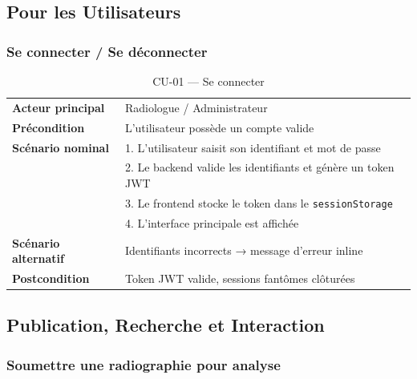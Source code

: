 \documentclass[12pt, a4paper]{report}
\begin{document}
\subsection{Pour les Utilisateurs}

\subsubsection{Se connecter / Se déconnecter}

\begin{table}[H]
\centering
\caption{CU-01 --- Se connecter}
\begin{tabularx}{\textwidth}{L{3.5cm} X}
\toprule
\textbf{Acteur principal} & Radiologue / Administrateur \\
\textbf{Précondition} & L'utilisateur possède un compte valide \\
\textbf{Scénario nominal} & 1. L'utilisateur saisit son identifiant et mot de passe \\
 & 2. Le backend valide les identifiants et génère un token JWT \\
 & 3. Le frontend stocke le token dans le \texttt{sessionStorage} \\
 & 4. L'interface principale est affichée \\
\textbf{Scénario alternatif} & Identifiants incorrects → message d'erreur inline \\
\textbf{Postcondition} & Token JWT valide, sessions fantômes clôturées \\
\bottomrule
\end{tabularx}
\end{table}

\subsection{Publication, Recherche et Interaction}

\subsubsection{Soumettre une radiographie pour analyse}
\end{document}

